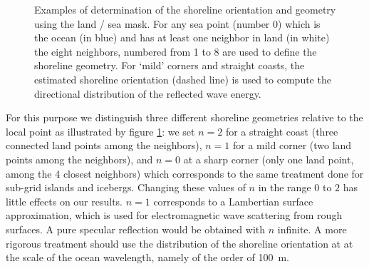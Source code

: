 \begin{figure} \begin{center}
\caption{Examples of determination of the shoreline orientation and geometry
  using the land / sea mask. For any sea point (number 0) which is the ocean
  (in blue) and has at least one neighbor in land (in white) the eight
  neighbors, numbered from 1 to 8 are used to define the shoreline geometry.
  For `mild' corners and straight coasts, the estimated shoreline orientation
  (dashed line) is used to compute the directional distribution of the
  reflected wave energy.  }
\label{fig:refl} \botline
\end{center}
\end{figure}

For this purpose we distinguish three different shoreline geometries relative
to the local point as illustrated by figure \ref{fig:refl}: we set $n=2$ for a
straight coast (three connected land points among the neighbors), $n=1$ for a
mild corner (two land points among the neighbors), and $n=0$ at a sharp corner
(only one land point, among the 4 closest neighbors) which corresponds to the
same treatment done for sub-grid islands and icebergs. Changing these values
of $n$ in the range $0$ to $2$ has little effects on our results.  $n=1$
corresponds to a Lambertian surface approximation, which is used for
electromagnetic wave scattering from rough surfaces. A pure specular
reflection would be obtained with $n$ infinite.  A more rigorous treatment
should use the distribution of the shoreline orientation at at the scale of
the ocean wavelength, namely of the order of 100~m.
